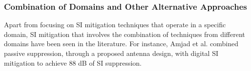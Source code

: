 \subsubsection{Combination of Domains and Other Alternative Approaches}
Apart from focusing on SI mitigation techniques that operate in a specific domain, SI mitigation that involves the combination of techniques from different domains have been seen in the literature. For instance, Amjad et al. \cite{amjad2018low} combined passive suppression, through a proposed antenna design, with digital SI mitigation to achieve 88 dB of SI suppression.

